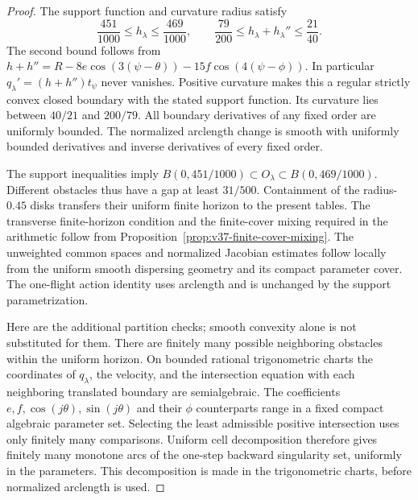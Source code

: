 \begin{proof}
The support function and curvature radius satisfy
\begin{equation}\label{eq:v37-support-bounds}
 \frac{451}{1000}\le h_\lambda\le\frac{469}{1000},\qquad
 \frac{79}{200}\le h_\lambda+h_\lambda''
                                  \le\frac{21}{40}.
\end{equation}
The second bound follows from
$h+h''=R-8e\cos(3(\psi-\theta))-15f\cos(4(\psi-\phi))$.
In particular $q_\lambda'=(h+h'')t_\psi$ never vanishes. Positive
curvature makes this a regular strictly convex closed boundary with
the stated support function. Its curvature lies between $40/21$ and
$200/79$. All boundary derivatives of any fixed order are uniformly
bounded. The normalized arclength change is smooth with uniformly
bounded derivatives and inverse derivatives of every fixed order.

The support inequalities imply
$B(0,451/1000)\subset O_\lambda\subset B(0,469/1000)$.
Different obstacles thus have a gap at least $31/500$.
Containment of the radius-$0.45$ disks transfers their uniform finite
horizon to the present tables. The transverse finite-horizon condition
and the finite-cover mixing required in the arithmetic follow from
Proposition~\ref{prop:v37-finite-cover-mixing}. The unweighted common
spaces and normalized Jacobian estimates follow locally from the
uniform smooth dispersing geometry and its compact parameter cover.
The one-flight action identity uses arclength and is unchanged by the
support parametrization.

Here are the additional partition checks; smooth convexity alone is
not substituted for them. There are finitely many possible neighboring
obstacles within the uniform horizon. On bounded rational trigonometric
charts the coordinates of $q_\lambda$, the velocity, and the
intersection equation with each neighboring translated boundary are
semialgebraic. The coefficients $e,f,\cos(j\theta),\sin(j\theta)$
and their $\phi$ counterparts range in a fixed compact algebraic
parameter set. Selecting the least admissible positive intersection
uses only finitely many comparisons. Uniform cell decomposition
therefore gives finitely many monotone arcs of the one-step backward
singularity set, uniformly in the parameters. This decomposition is
made in the trigonometric charts, before normalized arclength is used.


\end{proof}
